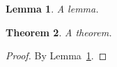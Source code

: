 \documentclass{article}
\newtheorem{theorem}{Theorem}
\newtheorem{lemma}[theorem]{Lemma}
\begin{document}
\begin{lemma}\label{l:a}
  A lemma.
\end{lemma}

\begin{theorem}\label{t:b}
  A theorem.
\end{theorem}
\begin{proof}
  By Lemma~\ref{l:a}.
\end{proof}

\proofgraph[width=.6\linewidth]
\end{document}
